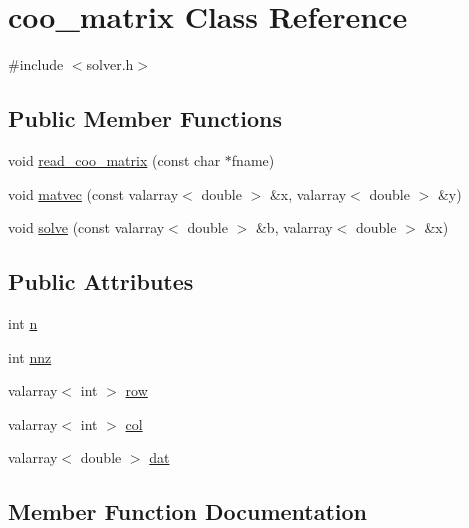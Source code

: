 \hypertarget{classcoo__matrix}{}\section{coo\+\_\+matrix Class Reference}
\label{classcoo__matrix}


{\ttfamily \#include $<$solver.\+h$>$}

\subsection*{Public Member Functions}
\begin{DoxyCompactItemize}
\item 
void \hyperlink{classcoo__matrix_aca6aed56a99ab4664c8c0f5871606a10}{read\+\_\+coo\+\_\+matrix} (const char $\ast$fname)
\item 
void \hyperlink{classcoo__matrix_a650551ff097541e73d1fc89c0dd9694c}{matvec} (const valarray$<$ double $>$ \&x, valarray$<$ double $>$ \&y)
\item 
void \hyperlink{classcoo__matrix_ac0cf916f9fa1c07e774c37d41407245c}{solve} (const valarray$<$ double $>$ \&b, valarray$<$ double $>$ \&x)
\end{DoxyCompactItemize}
\subsection*{Public Attributes}
\begin{DoxyCompactItemize}
\item 
int \hyperlink{classcoo__matrix_a6148ebf053576f70747dc3e260f25ea5}{n}
\item 
int \hyperlink{classcoo__matrix_a52ecd103d6c673a7e26457d29055fb3c}{nnz}
\item 
valarray$<$ int $>$ \hyperlink{classcoo__matrix_ad1e40669007eeeedcad75eb5606df654}{row}
\item 
valarray$<$ int $>$ \hyperlink{classcoo__matrix_ae49b54893e4b096df04e9b6a5ce02923}{col}
\item 
valarray$<$ double $>$ \hyperlink{classcoo__matrix_ab819a816424fa585d028739b5318959a}{dat}
\end{DoxyCompactItemize}


\subsection{Member Function Documentation}

